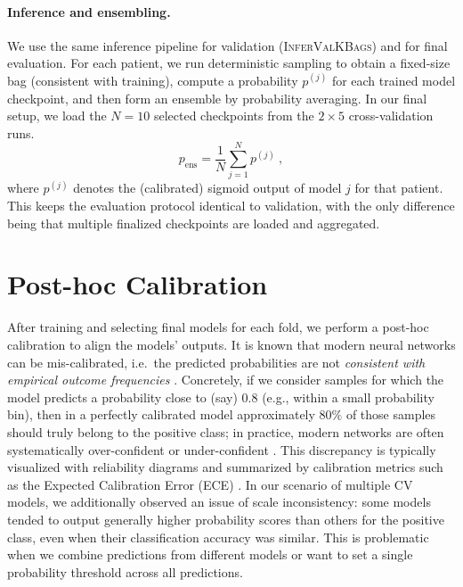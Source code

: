 \paragraph{Inference and ensembling.}
We use the same inference pipeline for validation (\textsc{Infer\allowbreak ValKBags})
and for final evaluation. For each patient, we run deterministic sampling to obtain a fixed-size bag (consistent with training), compute a probability $p^{(j)}$ for each trained model checkpoint, and then form an ensemble by probability averaging. In our final setup, we load the $N=10$ selected checkpoints from the $2\times 5$ cross-validation runs.
\begin{equation}\label{eq:ensemble_prob}
 p_{\text{ens}} = \frac{1}{N}\sum_{j=1}^{N} p^{(j)}~,
\end{equation}
where $p^{(j)}$ denotes the (calibrated) sigmoid output of model $j$ for that patient. This keeps the evaluation protocol identical to validation, with the only difference being that multiple finalized checkpoints are loaded and aggregated.

\section{Post-hoc Calibration}
\label{sec:calibration}
After training and selecting final models for each fold, we perform a post-hoc calibration to align the models’ outputs. It is known that modern neural networks can be mis-calibrated, i.e.\ the predicted probabilities are not \emph{consistent with empirical outcome frequencies} \cite{guo2017calibration}. Concretely, if we consider samples for which the model predicts a probability close to (say) $0.8$ (e.g., within a small probability bin), then in a perfectly calibrated model approximately $80\%$ of those samples should truly belong to the positive class; in practice, modern networks are often systematically over-confident or under-confident \cite{guo2017calibration}. This discrepancy is typically visualized with reliability diagrams and summarized by calibration metrics such as the Expected Calibration Error (ECE) \cite{guo2017calibration}.
In our scenario of multiple CV models, we additionally observed an issue of scale inconsistency: some models tended to output generally higher probability scores than others for the positive class, even when their classification accuracy was similar. This is problematic when we combine predictions from different models or want to set a single probability threshold across all predictions.

